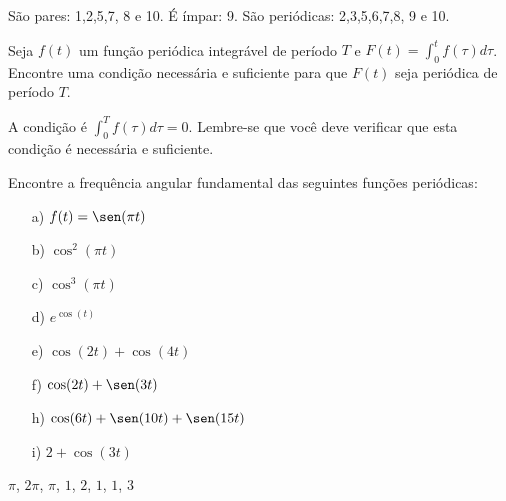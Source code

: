 \begin{resp}
São pares: 1,2,5,7, 8 e 10. É ímpar: 9. São periódicas: 2,3,5,6,7,8, 9 e 10.
\end{resp}
\begin{exer}Seja $f(t)$ um função periódica integrável de período $T$ e $F(t)=\int_0^tf(\tau)d\tau$. Encontre uma condição necessária e suficiente para que $F(t)$ seja periódica de período $T$.
\end{exer}
\begin{resp}
 A condição é $\int_0^Tf(\tau)d\tau=0$. Lembre-se que você deve verificar que esta condição é necessária e suficiente.
\end{resp}
 \begin{exer}{\label{freq_fund}} Encontre a frequência angular fundamental das seguintes funções periódicas:
\begin{itemize}
\item [a)] $f(t)= \sen(\pi t)$
\item [b)] $\cos^2(\pi t)$
\item [c)] $\cos^3(\pi t)$
\item [d)] $e^{\cos(t)}$
\item [e)] $\cos(2t)+\cos(4t)$
\item [f)] $\cos(2t)+\sen(3t)$
\item [h)] $\cos(6t)+\sen(10t)+\sen(15t)$
\item [i)] $2+\cos(3t)$
\end{itemize}
\end{exer}
\begin{resp}
$\pi$, $2\pi$, $\pi$, $1$, $2$, $1$, $1$, $3$
\end{resp}

